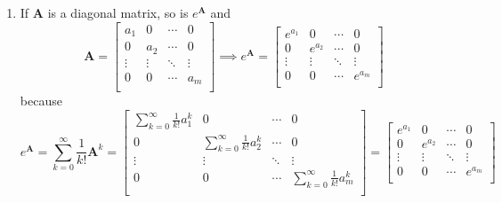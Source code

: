 \documentclass[12pt,a4paper]{article}
\begin{document}
\begin{itemize}
\begin{enumerate}
    \item If $\bm{A}$ is a diagonal matrix, so is $e^{\bm{A}}$ and
      \begin{equation}\nonumber%
        \bm{A}
        =
        \begin{bmatrix}
          a_{1} & 0 & \cdots & 0 \\
          0 & a_{2} & \cdots & 0 \\
          \vdots & \vdots & \ddots & \vdots \\
          0 & 0 & \cdots & a_{m} \\
        \end{bmatrix}
        \implies
        e^{\bm{A}} = 
        \begin{bmatrix}
          e^{a_{1}} & 0 & \cdots & 0 \\
          0 & e^{a_{2}} & \cdots & 0 \\
          \vdots & \vdots & \ddots & \vdots \\
          0 & 0 & \cdots & e^{a_{m}} \\
        \end{bmatrix}
      \end{equation}
      because
      \begin{equation}\nonumber%
        e^{\bm{A}} =
        \sum_{k=0}^{\infty} \frac{1}{k!}\bm{A}^{k}
        =
        \begin{bmatrix}
          \sum_{k=0}^{\infty} \frac{1}{k!}a_{1}^{k} & 0 & \cdots & 0 \\
          0 & \sum_{k=0}^{\infty} \frac{1}{k!}a_{2}^{k} & \cdots & 0 \\
          \vdots & \vdots & \ddots & \vdots \\
          0 & 0 & \cdots & \sum_{k=0}^{\infty} \frac{1}{k!}a_{m}^{k} \\
        \end{bmatrix}
        =
        \begin{bmatrix}
          e^{a_{1}} & 0 & \cdots & 0 \\
          0 & e^{a_{2}} & \cdots & 0 \\
          \vdots & \vdots & \ddots & \vdots \\
          0 & 0 & \cdots & e^{a_{m}} \\
        \end{bmatrix}
      \end{equation}


\end{enumerate}
\end{itemize}
\end{document}
